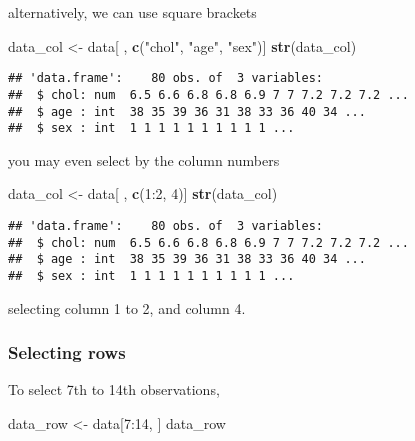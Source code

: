 \documentclass[]{book}
\newenvironment{Shaded}{\begin{snugshade}}{\end{snugshade}}
\newcommand{\KeywordTok}[1]{\textcolor[rgb]{0.13,0.29,0.53}{\textbf{{#1}}}}
\newcommand{\DecValTok}[1]{\textcolor[rgb]{0.00,0.00,0.81}{{#1}}}
\newcommand{\StringTok}[1]{\textcolor[rgb]{0.31,0.60,0.02}{{#1}}}
\newcommand{\NormalTok}[1]{{#1}}
\theoremstyle{definition}
\theoremstyle{definition}
\theoremstyle{remark}
\begin{document}
alternatively, we can use square brackets

\begin{Shaded}
\begin{Highlighting}[]
\NormalTok{data_col <-}\StringTok{ }\NormalTok{data[ , }\KeywordTok{c}\NormalTok{(}\StringTok{"chol"}\NormalTok{, }\StringTok{"age"}\NormalTok{, }\StringTok{"sex"}\NormalTok{)]}
\KeywordTok{str}\NormalTok{(data_col)}
\end{Highlighting}
\end{Shaded}

\begin{verbatim}
## 'data.frame':    80 obs. of  3 variables:
##  $ chol: num  6.5 6.6 6.8 6.8 6.9 7 7 7.2 7.2 7.2 ...
##  $ age : int  38 35 39 36 31 38 33 36 40 34 ...
##  $ sex : int  1 1 1 1 1 1 1 1 1 1 ...
\end{verbatim}

you may even select by the column numbers

\begin{Shaded}
\begin{Highlighting}[]
\NormalTok{data_col <-}\StringTok{ }\NormalTok{data[ , }\KeywordTok{c}\NormalTok{(}\DecValTok{1}\NormalTok{:}\DecValTok{2}\NormalTok{, }\DecValTok{4}\NormalTok{)]}
\KeywordTok{str}\NormalTok{(data_col)}
\end{Highlighting}
\end{Shaded}

\begin{verbatim}
## 'data.frame':    80 obs. of  3 variables:
##  $ chol: num  6.5 6.6 6.8 6.8 6.9 7 7 7.2 7.2 7.2 ...
##  $ age : int  38 35 39 36 31 38 33 36 40 34 ...
##  $ sex : int  1 1 1 1 1 1 1 1 1 1 ...
\end{verbatim}

selecting column 1 to 2, and column 4.

\subsubsection{Selecting rows}\label{selecting-rows}

To select 7th to 14th observations,

\begin{Shaded}
\begin{Highlighting}[]
\NormalTok{data_row <-}\StringTok{ }\NormalTok{data[}\DecValTok{7}\NormalTok{:}\DecValTok{14}\NormalTok{, ]}
\NormalTok{data_row}
\end{Highlighting}
\end{Shaded}
\end{document}
